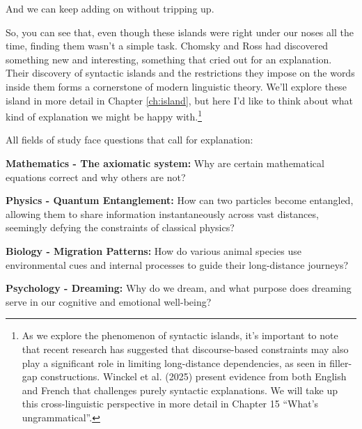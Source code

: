 \ea
\label{ex:non-island}
\z\z

And we can keep adding on without tripping up.

\ea
\label{ex:non-island-deep}
\z\z

So, you can see that, even though these islands were right under our noses all the time, finding them wasn't a simple task. Chomsky and Ross had discovered something new and interesting, something that cried out for an explanation. Their discovery of syntactic islands and the restrictions they impose on the words inside them forms a cornerstone of modern linguistic theory. We'll explore these island in more detail in Chapter \ref{ch:island}, but here I'd like to think about what kind of explanation we might be happy with.\footnote{As we explore the phenomenon of syntactic islands, it's important to note that recent research has suggested that discourse-based constraints may also play a significant role in limiting long-distance dependencies, as seen in filler-gap constructions. Winckel et al. (2025) present evidence from both English and French that challenges purely syntactic explanations. We will take up this cross-linguistic perspective in more detail in Chapter 15 ``What's ungrammatical''.}



All fields of study face questions that call for explanation:

    \textbf{Mathematics - The axiomatic system:} Why are certain mathematical equations correct and why others are not?

    \textbf{Physics - Quantum Entanglement:} How can two particles become entangled, allowing them to share information instantaneously across vast distances, seemingly defying the constraints of classical physics?

    \textbf{Biology - Migration Patterns:} How do various animal species use environmental cues and internal processes to guide their long-distance journeys?

    \textbf{Psychology - Dreaming:} Why do we dream, and what purpose does dreaming serve in our cognitive and emotional well-being?
    

